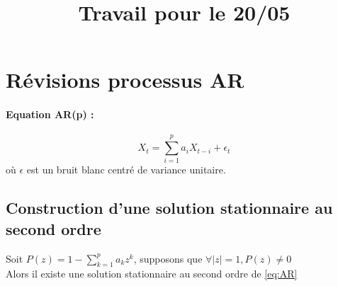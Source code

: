 \documentclass[a4paper,french]{article}
\title{Travail pour le 20/05}
\date{}
\begin{document}
\maketitle
\section{Révisions processus AR}
\paragraph{Equation AR(p) :} 
\begin{equation}\label{eq:AR}
X_t = \sum_{i=1}^p a_i X_{t-i} + \epsilon_t
\end{equation}
où $\epsilon$ est un bruit blanc centré de variance unitaire.
\subsection{Construction d'une solution stationnaire au second ordre}
\begin{Thm}
Soit $P(z)=1-\sum_{k=1}^p a_k z^k$, supposons que $\forall |z|=1, P(z)\neq 0$ \\
Alors il existe une solution stationnaire au second ordre de \eqref{eq:AR} 
\end{Thm}
\end{document}
